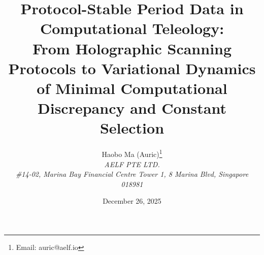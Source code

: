 \documentclass[11pt,a4paper]{article}
\title{Protocol-Stable Period Data in Computational Teleology:\\
From Holographic Scanning Protocols to Variational Dynamics\\
of Minimal Computational Discrepancy and Constant Selection}
\author{Haobo Ma (Auric)\thanks{Email: auric@aelf.io} \\
\textit{AELF PTE LTD.} \\
\textit{\#14-02, Marina Bay Financial Centre Tower 1, 8 Marina Blvd, Singapore 018981}}
\date{December 26, 2025}
\begin{document}
\maketitle














\FloatBarrier
\appendix


\FloatBarrier

\end{document}
